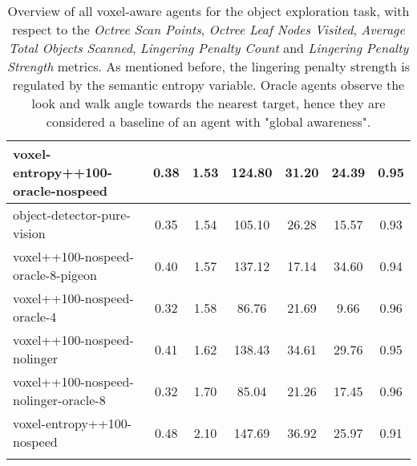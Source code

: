 \begin{sidewaystable}
\begin{longtable}{|l|c|c|c|c|c|c|}
voxel-entropy++100-oracle-nospeed & {\cellcolor[HTML]{76BAAC}} \color[HTML]{000000} 0.38 & {\cellcolor[HTML]{7EBEB1}} \color[HTML]{000000} 1.53 & {\cellcolor[HTML]{7DBDB0}} \color[HTML]{000000} 124.80 & 31.20 & 24.39 & 0.95 \\ \hline
object-detector-pure-vision & {\cellcolor[HTML]{80BFB2}} \color[HTML]{000000} 0.35 & {\cellcolor[HTML]{7EBEB1}} \color[HTML]{000000} 1.54 & {\cellcolor[HTML]{95C9BE}} \color[HTML]{000000} 105.10 & 26.28 & 15.57 & 0.93 \\ \hline
voxel++100-nospeed-oracle-8-pigeon & {\cellcolor[HTML]{6FB6A8}} \color[HTML]{F1F1F1} 0.40 & {\cellcolor[HTML]{7BBCAF}} \color[HTML]{000000} 1.57 & {\cellcolor[HTML]{6EB6A8}} \color[HTML]{F1F1F1} 137.12 & 17.14 & 34.60 & 0.94 \\ \hline
voxel++100-nospeed-oracle-4 & {\cellcolor[HTML]{8BC4B8}} \color[HTML]{000000} 0.32 & {\cellcolor[HTML]{7BBCAF}} \color[HTML]{000000} 1.58 & {\cellcolor[HTML]{ABD3CB}} \color[HTML]{000000} 86.76 & 21.69 & 9.66 & 0.96 \\ \hline
voxel++100-nospeed-nolinger & {\cellcolor[HTML]{6CB5A6}} \color[HTML]{F1F1F1} 0.41 & {\cellcolor[HTML]{78BBAD}} \color[HTML]{000000} 1.62 & {\cellcolor[HTML]{6DB5A7}} \color[HTML]{F1F1F1} 138.43 & 34.61 & 29.76 & 0.95 \\ \hline
voxel++100-nospeed-nolinger-oracle-8 & {\cellcolor[HTML]{88C3B7}} \color[HTML]{000000} 0.32 & {\cellcolor[HTML]{72B8AA}} \color[HTML]{F1F1F1} 1.70 & {\cellcolor[HTML]{ADD4CC}} \color[HTML]{000000} 85.04 & 21.26 & 17.45 & 0.96 \\ \hline
voxel-entropy++100-nospeed & {\cellcolor[HTML]{55AA99}} \color[HTML]{F1F1F1} 0.48 & {\cellcolor[HTML]{55AA99}} \color[HTML]{F1F1F1} 2.10 & {\cellcolor[HTML]{62B0A1}} \color[HTML]{F1F1F1} 147.69 & 36.92 & 25.97 & 0.91 \\ \hline


            
            \caption{
                Overview of all voxel-aware agents for the object exploration task, with respect to the \textit{Octree Scan Points}, \textit{Octree Leaf Nodes Visited}, \textit{Average Total Objects Scanned}, 
                \textit{Lingering Penalty Count} and \textit{Lingering Penalty Strength} metrics. As mentioned before, the lingering penalty strength is regulated by the semantic entropy variable. Oracle agents observe the look and walk angle towards the nearest target, hence they are considered a baseline of an agent with "global awareness".
            }
            \label{tab:results-RQ1-explorative-performance}
        \end{longtable}

\end{sidewaystable}


